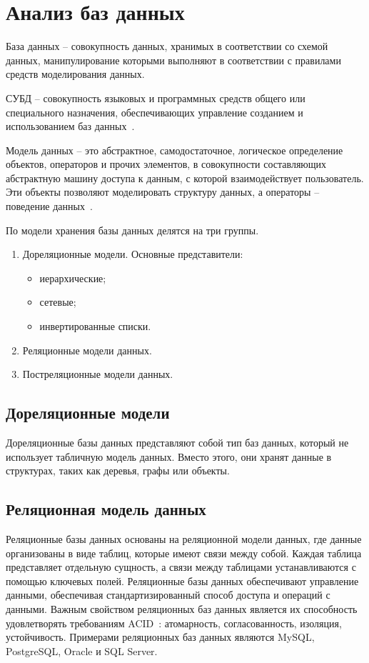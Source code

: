 \section{Анализ баз данных}
База данных -- совокупность данных, хранимых в соответствии со схемой данных, манипулирование которыми выполняют в соответствии с правилами средств моделирования данных.

СУБД -- совокупность языковых и программных средств общего или специального назначения, обеспечивающих управление созданием и использованием баз данных~\cite{williams}.

Модель данных -- это абстрактное, самодостаточное, логическое определение объектов, операторов и прочих элементов, в совокупности составляющих абстрактную машину доступа к данным, с которой взаимодействует пользователь. Эти объекты позволяют моделировать структуру данных, а операторы -- поведение данных~\cite{williams}.

По модели хранения базы данных делятся на три группы.
\begin{enumerate}
    \item Дореляционные модели. Основные представители:
    \begin{itemize}
        \item иерархические;
        \item сетевые;
        \item инвертированные списки.
    \end{itemize}
    \item Реляционные модели данных.
    \item Постреляционные модели данных.
\end{enumerate}

\subsection*{Дореляционные модели}
Дореляционные базы данных представляют собой тип баз данных, который не использует табличную модель данных. Вместо этого, они хранят данные в структурах, таких как деревья, графы или объекты. 

\subsection*{Реляционная модель данных}
Реляционные базы данных основаны на реляционной модели данных, где данные организованы в виде таблиц, которые имеют связи между собой. Каждая таблица представляет отдельную сущность, а связи между таблицами устанавливаются с помощью ключевых полей. Реляционные базы данных обеспечивают управление данными, обеспечивая стандартизированный способ доступа и операций с данными. Важным свойством реляционных баз данных является их способность удовлетворять требованиям ACID~\cite{acid}: атомарность, согласованность, изоляция, устойчивость. Примерами реляционных баз данных являются MySQL, PostgreSQL, Oracle и SQL Server.

